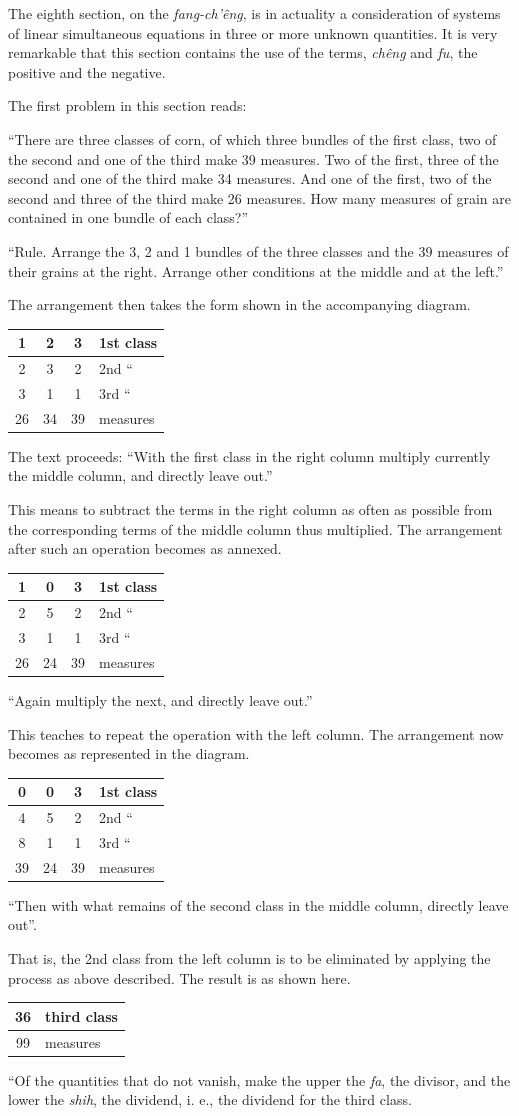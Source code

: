 \documentclass[11pt]{article}
\newcommand{\scanpage}[2]{\clearpage\setcounter{footnote}{0}\noindent{\footnotesize\color{gray}PDF page #1 · #2}\par\medskip}
\newcommand{\scanfooter}{}
\newcommand{\fangtableA}{\begin{tabular}{|c|c|c|l|}\hline 1&2&3&1st class\\\hline 2&3&2&2nd ``\\\hline 3&1&1&3rd ``\\\hline 26&34&39&measures\\\hline\end{tabular}}
\newcommand{\fangtableB}{\begin{tabular}{|c|c|c|l|}\hline 1&0&3&1st class\\\hline 2&5&2&2nd ``\\\hline 3&1&1&3rd ``\\\hline 26&24&39&measures\\\hline\end{tabular}}
\newcommand{\fangtableC}{\begin{tabular}{|c|c|c|l|}\hline 0&0&3&1st class\\\hline 4&5&2&2nd ``\\\hline 8&1&1&3rd ``\\\hline 39&24&39&measures\\\hline\end{tabular}}
\newcommand{\fangtableD}{\begin{tabular}{|c|l|}\hline 36&third class\\\hline 99&measures\\\hline\end{tabular}}
\begin{document}
The eighth section, on the \emph{fang-ch'êng}, is in actuality a consideration of systems of linear simultaneous equations in three or more unknown quantities. It is very remarkable that this section contains the use of the terms, \emph{chêng} and \emph{fu}, the positive and the negative.

The first problem in this section reads:

``There are three classes of corn, of which three bundles of the first class, two of the second and one of the third make 39 measures. Two of the first, three of the second and one of the third make 34 measures. And one of the first, two of the second and three of the third make 26 measures. How many measures of grain are contained in one bundle of each class?''

``Rule. Arrange the 3, 2 and 1 bundles of the three classes and the 39 measures of their grains at the right. Arrange other conditions at the middle and at the left.''

The arrangement then takes the form shown in the accompanying diagram.
\begin{center}
\fangtableA
\end{center}
The text proceeds: ``With the first class in the right column multiply currently the middle column, and directly leave out.''
\scanfooter

\scanpage{0033}{Chapter 3, printed page 19}
This means to subtract the terms in the right column as often as possible from the corresponding terms of the middle column thus multiplied. The arrangement after such an operation becomes as annexed.
\begin{center}\fangtableB\end{center}

``Again multiply the next, and directly leave out.''

This teaches to repeat the operation with the left column. The arrangement now becomes as represented in the diagram.
\begin{center}\fangtableC\end{center}

``Then with what remains of the second class in the middle column, directly leave out''.

That is, the 2nd class from the left column is to be eliminated by applying the process as above described. The result is as shown here.
\begin{center}\fangtableD\end{center}

``Of the quantities that do not vanish, make the upper the \emph{fa}, the divisor, and the lower the \emph{shih}, the dividend, i. e., the dividend for the third class.
\end{document}
